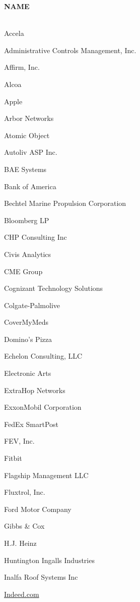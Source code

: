 \documentclass[twoside]{article}
\begin{document}
\begin{center}
\begin{multicols}{5}
\begin{FlushLeft}
        \end{FlushLeft}
        \vspace{1em}
        {\fontsize{14}{16}\selectfont \bf NAME}\\
        \vspace{-1em}
        ~\hrulefill~
        \vspace{-.9em}
        \begin{FlushLeft}
        \begin{compactitem}
        \item Accela
\item Administrative Controls Management, Inc.
\item Affirm, Inc.
\item Alcoa
\item Apple
\item Arbor Networks
\item Atomic Object
\item Autoliv ASP Inc.
\item BAE Systems
\item Bank of America
\item Bechtel Marine Propulsion Corporation
\item Bloomberg LP
\item CHP Consulting Inc
\item Civis Analytics
\item CME Group
\item Cognizant Technology Solutions
\item Colgate-Palmolive
\item CoverMyMeds
\item Domino's Pizza
\item Echelon Consulting, LLC
\item Electronic Arts
\item ExtraHop Networks
\item ExxonMobil Corporation
\item FedEx SmartPost
\item FEV, Inc.
\item Fitbit
\item Flagship Management LLC
\item Fluxtrol, Inc.
\item Ford Motor Company
\item Gibbs \& Cox
\item H.J. Heinz
\item Huntington Ingalls Industries
\item Inalfa Roof Systems Inc
\item \url{Indeed.com}

\end{compactitem}
\end{FlushLeft}
\end{multicols}
\end{center}
\end{document}
